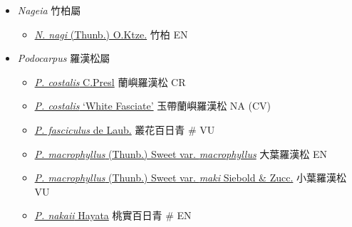 
  \begin{itemize}
 \item[] \textit{Nageia} 竹柏屬
                            
  \begin{itemize}
        \item[] \href{http://www.theplantlist.org/tpl1.1/search?q=Nageia+nagi}{\textit{N. nagi} (Thunb.) O.Ktze.}   竹柏   EN
  \end{itemize}
 \item[] \textit{Podocarpus} 羅漢松屬
                            
  \begin{itemize}
        \item[] \href{http://www.theplantlist.org/tpl1.1/search?q=Podocarpus+costalis}{\textit{P. costalis} C.Presl}   蘭嶼羅漢松   CR
        \item[] \href{http://www.theplantlist.org/tpl1.1/search?q=Podocarpus+costalis}{\textit{P. costalis} ‘White Fasciate’}   玉帶蘭嶼羅漢松   NA (CV)
        \item[] \href{http://www.theplantlist.org/tpl1.1/search?q=Podocarpus+fasciculus}{\textit{P. fasciculus} de Laub.}   叢花百日青  \# VU
        \item[] \href{http://www.theplantlist.org/tpl1.1/search?q=Podocarpus+macrophyllus+var.+macrophyllus}{\textit{P. macrophyllus} (Thunb.) Sweet var. \textit{macrophyllus}}  
                                    大葉羅漢松   EN
        \item[] \href{http://www.theplantlist.org/tpl1.1/search?q=Podocarpus+macrophyllus+var.+maki}{\textit{P. macrophyllus} (Thunb.) Sweet var. \textit{maki} Siebold \& Zucc.}  
                                    小葉羅漢松   VU
        \item[] \href{http://www.theplantlist.org/tpl1.1/search?q=Podocarpus+nakaii}{\textit{P. nakaii} Hayata}   桃實百日青  \# EN
  \end{itemize}
  \end{itemize}

